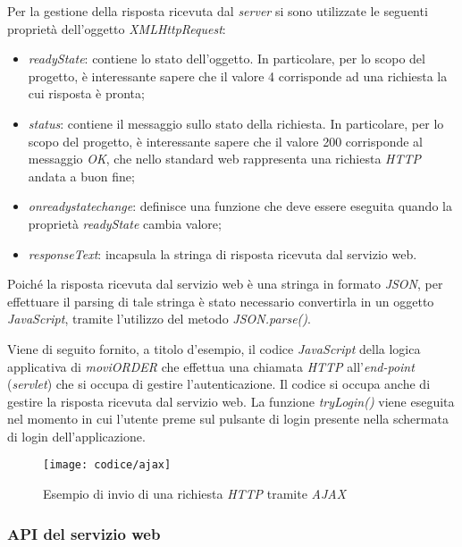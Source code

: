 Per la gestione della risposta ricevuta dal \textit{server} si sono utilizzate le seguenti proprietà dell'oggetto \textit{XMLHttpRequest}:
\begin{itemize}
	\item \textit{readyState}: contiene lo stato dell'oggetto. In particolare, per lo scopo del progetto, è interessante sapere che il valore 4 corrisponde ad una richiesta la cui risposta è pronta;
	\item  \textit{status}: contiene il messaggio sullo stato della richiesta. In particolare, per lo scopo del progetto, è interessante sapere che il valore 200 corrisponde al messaggio \textit{OK}, che nello standard web rappresenta una richiesta \textit{HTTP} andata a buon fine;
	\item \textit{onreadystatechange}: definisce una funzione che deve essere eseguita quando la proprietà \textit{readyState} cambia valore;
	\item \textit{responseText}: incapsula la stringa di risposta ricevuta dal servizio web. 
\end{itemize} 
Poiché la risposta ricevuta dal servizio web è una stringa in formato \textit{JSON}, per effettuare il parsing di tale stringa è stato necessario convertirla in un oggetto \textit{JavaScript}, tramite l'utilizzo del metodo \textit{JSON.parse()}.

Viene di seguito fornito, a titolo d'esempio, il codice \textit{JavaScript} della logica applicativa di \textit{moviORDER} che effettua una chiamata \textit{HTTP} all'\textit{end-point} (\textit{servlet}) che si occupa di gestire l'autenticazione. Il codice si occupa anche di gestire la risposta ricevuta dal servizio web. La funzione \textit{tryLogin()} viene eseguita nel momento in cui l'utente preme sul pulsante di login presente nella schermata di login dell'applicazione.

\newpage

\begin{figure}[!h] 
    \centering 
    \texttt{[image: codice/ajax]} 
    \caption{Esempio di invio di una richiesta \textit{HTTP} tramite \textit{AJAX}}
\end{figure}

\subsubsection{API del servizio web} \label{api}

